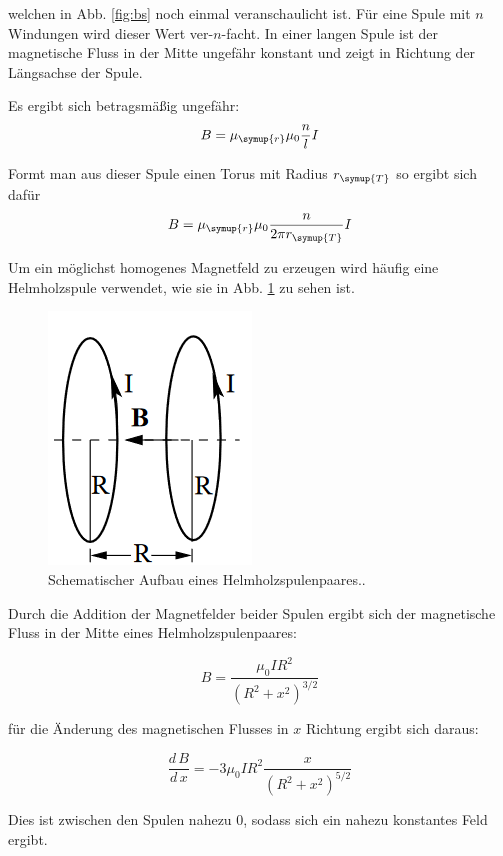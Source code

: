 welchen in Abb. \ref{fig:bs} noch einmal veranschaulicht ist.
Für eine Spule mit $n$ Windungen wird dieser Wert ver-$n$-facht.
In einer langen Spule ist der magnetische Fluss in der Mitte ungefähr
konstant und zeigt in Richtung der Längsachse der Spule.

Es ergibt sich betragsmäßig ungefähr:
\begin{equation}
  B = \mu_{\symup{r}}\mu_0\frac{n}{l}I
  \label{eqn:Bspule}
\end{equation}

Formt man aus dieser Spule einen Torus mit Radius $r_{\symup{T}}$
so ergibt sich dafür
\begin{equation}
  B = \mu_{\symup{r}}\mu_0\frac{n}{2\pi r_{\symup{T}}}I
  \label{eqn:Btorus}
\end{equation}

Um ein möglichst homogenes Magnetfeld zu erzeugen wird häufig
eine Helmholzspule verwendet, wie sie in Abb. \ref{fig:hh} zu sehen ist.

\begin{figure}
  \centering
  \includegraphics{content/images/Konzept Helmholz.png}
  \caption{Schematischer Aufbau eines Helmholzspulenpaares.\cite{anleitung}.}
  \label{fig:hh}
\end{figure}

Durch die Addition der Magnetfelder beider Spulen ergibt sich
der magnetische Fluss in der Mitte eines Helmholzspulenpaares:

\begin{equation}
  B=\frac{\mu_0IR^2}{\left(R^2+x^2\right)^{3/2}}
\end{equation}

für die Änderung des magnetischen Flusses in $x$ Richtung ergibt sich daraus:

\begin{equation}
  \frac{d\,B}{d\,x}=-3\mu_0IR^2\frac{x}{\left(R^2+x^2\right)^{5/2}}
  \label{eqn:hh}
\end{equation}

Dies ist zwischen den Spulen nahezu 0, sodass sich ein nahezu konstantes Feld ergibt.
